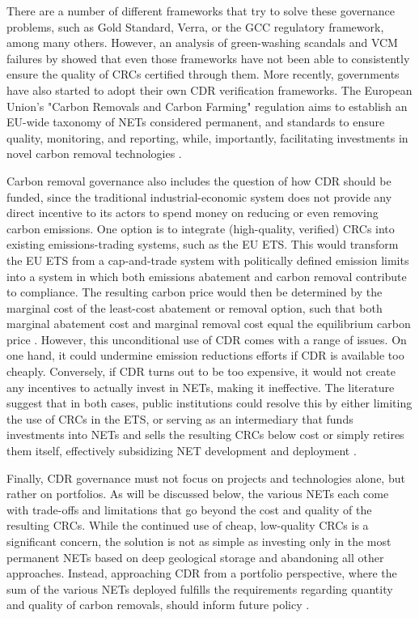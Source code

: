 There are a number of different frameworks that try to solve these governance problems, such as Gold Standard, Verra, or the GCC regulatory framework, among many others. However, an analysis of green-washing scandals and VCM failures by \textcite{sasaki_addressing_2025} showed that even those frameworks have not been able to consistently ensure the quality of CRCs certified through them. More recently, governments have also started to adopt their own CDR verification frameworks. The European Union's "Carbon Removals and Carbon Farming" regulation aims to establish an EU-wide taxonomy of NETs considered permanent, and standards to ensure quality, monitoring, and reporting, while, importantly, facilitating investments in novel carbon removal technologies \parencite{european_parliament_regulation_2024}.\vspace{2mm}

Carbon removal governance also includes the question of how CDR should be funded, since the traditional industrial-economic system does not provide any direct incentive to its actors to spend money on reducing or even removing carbon emissions. One option is to integrate (high-quality, verified) CRCs into existing emissions-trading systems, such as the EU ETS. This would transform the EU ETS from a cap-and-trade system with politically defined emission limits into a system in which both emissions abatement and carbon removal contribute to compliance. The resulting carbon price would then be determined by the marginal cost of the least-cost abatement or removal option, such that both marginal abatement cost and marginal removal cost equal the equilibrium carbon price \parencite{rickels_integrating_2021}. However, this unconditional use of CDR comes with a range of issues. On one hand, it could undermine emission reductions efforts if CDR is available too cheaply. Conversely, if CDR turns out to be too expensive, it would not create any incentives to actually invest in NETs, making it ineffective. The literature suggest that in both cases, public institutions could resolve this by either limiting the use of CRCs in the ETS, or serving as an intermediary that funds investments into NETs and sells the resulting CRCs below cost or simply retires them itself, effectively subsidizing NET development and deployment \parencite{edenhofer_economics_2024}.\vspace{2mm}

Finally, CDR governance must not focus on projects and technologies alone, but rather on portfolios. As will be discussed below, the various NETs each come with trade-offs and limitations that go beyond the cost and quality of the resulting CRCs. While the continued use of cheap, low-quality CRCs is a significant concern, the solution is not as simple as investing only in the most permanent NETs based on deep geological storage and abandoning all other approaches. Instead, approaching CDR from a portfolio perspective, where the sum of the various NETs deployed fulfills the requirements regarding quantity and quality of carbon removals, should inform future policy \parencite{braun_global_2022}.

